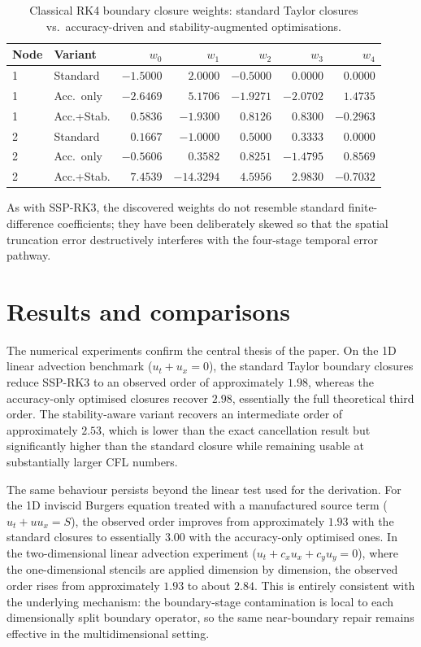 \documentclass[review,hidelinks,onefignum,onetabnum]{siamart251216}
\begin{document}
\begin{table}[tbhp]
\centering
\caption{Classical RK4 boundary closure weights: standard Taylor closures vs.\ accuracy-driven and stability-augmented optimisations.}
\label{tab:weights_rk4}
\begin{tabular}{llrrrrr}
\toprule
Node & Variant & $w_0$ & $w_1$ & $w_2$ & $w_3$ & $w_4$ \\
\midrule
1 & Standard     & $-1.5000$ & $2.0000$ & $-0.5000$ & $0.0000$ & $0.0000$ \\
1 & Acc.\ only   & $-2.6469$ & $5.1706$ & $-1.9271$ & $-2.0702$ & $1.4735$ \\
1 & Acc.+Stab.   & $0.5836$ & $-1.9300$ & $0.8126$ & $0.8300$ & $-0.2963$ \\
\midrule
2 & Standard     & $0.1667$ & $-1.0000$ & $0.5000$ & $0.3333$ & $0.0000$ \\
2 & Acc.\ only   & $-0.5606$ & $0.3582$ & $0.8251$ & $-1.4795$ & $0.8569$ \\
2 & Acc.+Stab.   & $7.4539$ & $-14.3294$ & $4.5956$ & $2.9830$ & $-0.7032$ \\
\bottomrule
\end{tabular}
\end{table}

As with SSP-RK3, the discovered weights do not resemble standard finite-difference coefficients; they have been deliberately skewed so that the spatial truncation error destructively interferes with the four-stage temporal error pathway.

\section{Results and comparisons}
\label{sec:results}

The numerical experiments confirm the central thesis of the paper. On the 1D linear advection benchmark ($u_t + u_x = 0$), the standard Taylor boundary closures reduce SSP-RK3 to an observed order of approximately $1.98$, whereas the accuracy-only optimised closures recover $2.98$, essentially the full theoretical third order. The stability-aware variant recovers an intermediate order of approximately $2.53$, which is lower than the exact cancellation result but significantly higher than the standard closure while remaining usable at substantially larger CFL numbers.

The same behaviour persists beyond the linear test used for the derivation. For the 1D inviscid Burgers equation treated with a manufactured source term ($u_t + uu_x = S$), the observed order improves from approximately $1.93$ with the standard closures to essentially $3.00$ with the accuracy-only optimised ones. In the two-dimensional linear advection experiment ($u_t + c_x u_x + c_y u_y = 0$), where the one-dimensional stencils are applied dimension by dimension, the observed order rises from approximately $1.93$ to about $2.84$. This is entirely consistent with the underlying mechanism: the boundary-stage contamination is local to each dimensionally split boundary operator, so the same near-boundary repair remains effective in the multidimensional setting.
\end{document}
